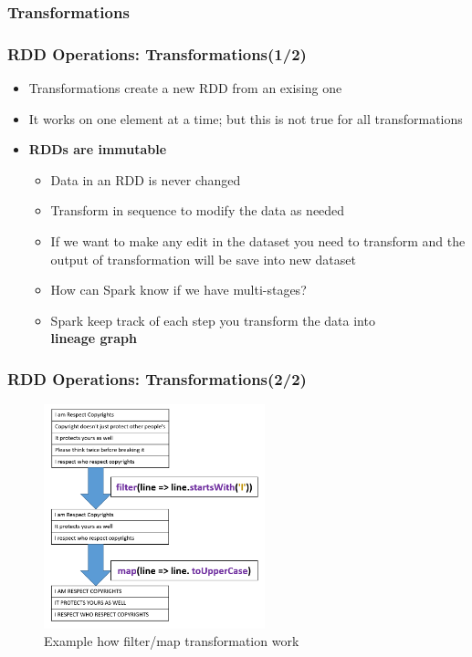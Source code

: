 \subsubsection{Transformations}
\begin{frame}
  \frametitle{RDD Operations: Transformations(1/2)}
	\begin{itemize}[<+->]
		\item Transformations create a new RDD from an exising one
		\item It works on one element at a time; but this is not true for all transformations
		\item \textbf{RDDs are immutable}
			\begin{itemize}
			\item Data in an RDD is never changed
			\item Transform in sequence to modify the data as needed
			\item If we want to make any edit in the dataset you need to transform and the output of transformation will be save into new dataset
			\item How can Spark know if we have multi-stages? 
			\item Spark keep track of each step you transform the data into \\ \textbf{lineage graph} 
			\end{itemize}
	\end{itemize}
\end{frame}


\begin{frame}
  \frametitle{RDD Operations: Transformations(2/2)}

  \begin{figure}
	\caption{Example how filter/map transformation work}  	
		\includegraphics[width=\textwidth,height=6.5cm]{Graphics/MapGraph.PNG}
\end{figure}


\end{frame}

